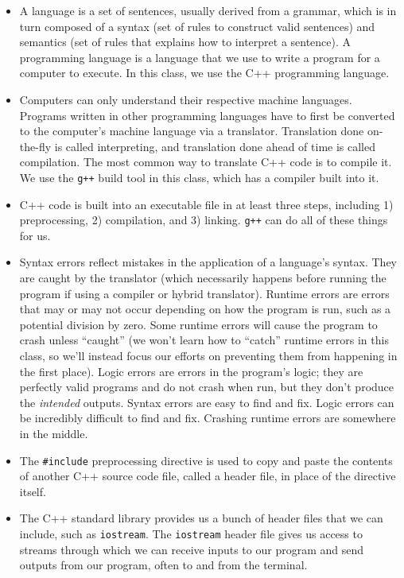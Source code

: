 \documentclass{article}
\begin{document}
\begin{itemize}
    \item A language is a set of sentences, usually derived from a grammar, which is in turn composed of a syntax (set of rules to construct valid sentences) and semantics (set of rules that explains how to interpret a sentence). A programming language is a language that we use to write a program for a computer to execute. In this class, we use the C++ programming language.
    \item Computers can only understand their respective machine languages. Programs written in other programming languages have to first be converted to the computer's machine language via a translator. Translation done on-the-fly is called interpreting, and translation done ahead of time is called compilation. The most common way to translate C++ code is to compile it. We use the \texttt{g++} build tool in this class, which has a compiler built into it.
    \item C++ code is built into an executable file in at least three steps, including 1) preprocessing, 2) compilation, and 3) linking. \texttt{g++} can do all of these things for us.
    \item Syntax errors reflect mistakes in the application of a language's syntax. They are caught by the translator (which necessarily happens before running the program if using a compiler or hybrid translator). Runtime errors are errors that may or may not occur depending on how the program is run, such as a potential division by zero. Some runtime errors will cause the program to crash unless ``caught'' (we won't learn how to ``catch'' runtime errors in this class, so we'll instead focus our efforts on preventing them from happening in the first place). Logic errors are errors in the program's logic; they are perfectly valid programs and do not crash when run, but they don't produce the \textit{intended} outputs. Syntax errors are easy to find and fix. Logic errors can be incredibly difficult to find and fix. Crashing runtime errors are somewhere in the middle.
    \item The \texttt{\#include} preprocessing directive is used to copy and paste the contents of another C++ source code file, called a header file, in place of the directive itself.
    \item The C++ standard library provides us a bunch of header files that we can include, such as \texttt{iostream}. The \texttt{iostream} header file gives us access to streams through which we can receive inputs to our program and send outputs from our program, often to and from the terminal.

\end{itemize}
\end{document}
